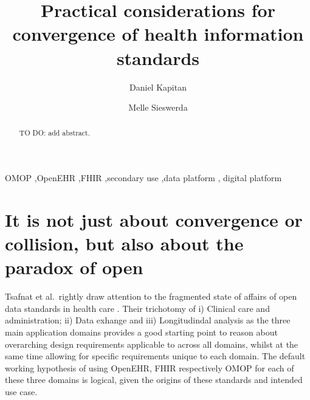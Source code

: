 \documentclass[
  authoryear]{elsarticle}
\begin{document}
\begin{frontmatter}
\title{Practical considerations for convergence of health information
standards}
\author[1,2,3]{Daniel Kapitan%
%
}
\author[4,5]{Melle Sieswerda%
%
}





        
\begin{abstract}
TO DO: add abstract.
\end{abstract}





\begin{keyword}
    OMOP \sep OpenEHR \sep FHIR \sep secondary use \sep data
platform \sep 
    digital platform
\end{keyword}
\end{frontmatter}
    
\section{It is not just about convergence or collision, but also about
the paradox of
open}\label{it-is-not-just-about-convergence-or-collision-but-also-about-the-paradox-of-open}

Tsafnat et al.~rightly draw attention to the fragmented state of affairs
of open data standards in health care \citep{tsafnat2024converge}. Their
trichotomy of i) Clinical care and administration; ii) Data exhange and
iii) Longitudindal analysis as the three main application domains
provides a good starting point to reason about overarching design
requirements applicable to across all domains, whilst at the same time
allowing for specific requirements unique to each domain. The default
working hypothesis of using OpenEHR, FHIR respectively OMOP for each of
these three domains is logical, given the origins of these standards and
intended use case.
\end{document}
